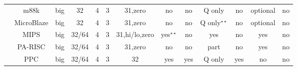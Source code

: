 \begin{sidewaystable}[tbp]
\begin{sf}
\begin{footnotesize}
\begin{center}
\begin{tabular}{|c|c||c|c|c|c|c|c|c|c|c|c|c|}
		 & %
m88k             & %
big              & %
32               & %
4                & %
3                & %
31,zero          & %
no               & %
no               & %
Q only           & %
no               & %
optional         & %
no                 %
\\
\cline{2-13}

		 & %
MicroBlaze       & %
big              & %
32               & %
4                & %
3                & %
31,zero          & %
no               & %
no               & %
Q only$^{\star\star}$ & %
no               & %
optional         & %
no                 %
\\
\cline{2-13}

		 & %
MIPS             & %
big              & %
32/64            & %
4                & %
3                & %
31,hi/lo,zero    & %
yes$^{\star\star}$& %
no               & %
yes              & %
no               & %
yes              & %
no                 %
\\
\cline{2-13}

                 & %
PA-RISC          & %
big              & %
32/64            & %
4                & %
3                & %
31,zero          & %
no               & %
no               & %
part             & %
no               & %
yes              & %
no                 %
\\
\cline{2-13}

                 & %
PPC              & %
big              & %
32/64            & %
4                & %
3                & %
32               & %
yes              & %
yes              & %
Q only           & %
yes              & %
no               & %
no                 %
\\
\cline{2-13}


\end{tabular}
\end{center}
\end{footnotesize}
\end{sf}
\end{sidewaystable}

